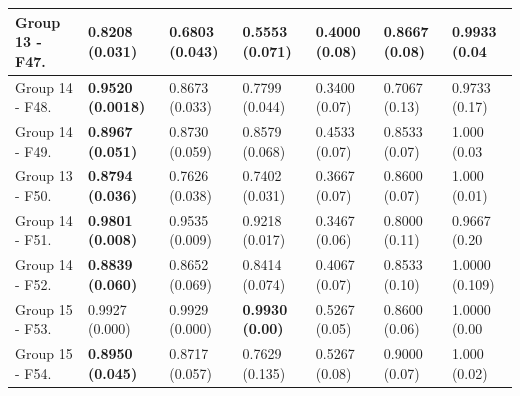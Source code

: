 \begin{center}
\begin{table}[!t]
\begin{tabular}{ccccccc}
		\multicolumn{1}{|l|}{Group 13 - F47.}  & \multicolumn{1}{l}{\textbf{0.8208 (0.031)}} & \multicolumn{1}{l}{0.6803 (0.043)} & \multicolumn{1}{l|}{0.5553 (0.071)}  		& \multicolumn{1}{l}{0.4000 (0.08)} & \multicolumn{1}{l}{0.8667 (0.08)} & \multicolumn{1}{l|}{0.9933 (0.04} \\ \hline
		\multicolumn{1}{|l|}{Group 14 - F48.} & \multicolumn{1}{l}{\textbf{0.9520 (0.0018)}} & \multicolumn{1}{l}{0.8673 (0.033)} & \multicolumn{1}{l|}{0.7799 (0.044)} & \multicolumn{1}{l}{0.3400 (0.07)} & \multicolumn{1}{l}{0.7067 (0.13)} & \multicolumn{1}{l|}{0.9733 (0.17)}  \\ \hline
		\multicolumn{1}{|l|}{Group 14 - F49.}  & \multicolumn{1}{l}{\textbf{0.8967 (0.051)}} & \multicolumn{1}{l}{0.8730 (0.059)} & \multicolumn{1}{l|}{0.8579 (0.068)}  		& \multicolumn{1}{l}{0.4533 (0.07)} & \multicolumn{1}{l}{0.8533 (0.07)} & \multicolumn{1}{l|}{1.000 (0.03} \\ \hline
		\multicolumn{1}{|l|}{Group 13 - F50.}              & \multicolumn{1}{l}{\textbf{0.8794 (0.036)}} & \multicolumn{1}{l}{0.7626 (0.038)} & \multicolumn{1}{l|}{0.7402 (0.031)}  		& \multicolumn{1}{l}{0.3667 (0.07)} & \multicolumn{1}{l}{0.8600 (0.07)} & \multicolumn{1}{l|}{1.000 (0.01)}  \\ \hline%
		\multicolumn{1}{|l|}{Group 14 - F51.}  & \multicolumn{1}{l}{\textbf{0.9801 (0.008)}} & \multicolumn{1}{l}{0.9535 (0.009)} & \multicolumn{1}{l|}{0.9218 (0.017)}  		& \multicolumn{1}{l}{0.3467 (0.06)} & \multicolumn{1}{l}{0.8000 (0.11)} & \multicolumn{1}{l|}{0.9667 (0.20} \\ \hline
		\multicolumn{1}{|l|}{Group 14 - F52.}              & \multicolumn{1}{l}{\textbf{0.8839 (0.060)}} & \multicolumn{1}{l}{0.8652 (0.069)} & \multicolumn{1}{l|}{0.8414 (0.074)}  		& \multicolumn{1}{l}{0.4067 (0.07)} & \multicolumn{1}{l}{0.8533 (0.10)} & \multicolumn{1}{l|}{1.0000 (0.109)}  \\ \hline %
		\multicolumn{1}{|l|}{Group 15 - F53.}  & \multicolumn{1}{l}{0.9927 (0.000)} & \multicolumn{1}{l}{0.9929 (0.000)} & \multicolumn{1}{l|}{\textbf{0.9930 (0.00)}}  		& \multicolumn{1}{l}{0.5267 (0.05)} & \multicolumn{1}{l}{0.8600 (0.06)} & \multicolumn{1}{l|}{1.0000 (0.00} \\ \hline
		\multicolumn{1}{|l|}{Group 15 - F54.}              & \multicolumn{1}{l}{\textbf{0.8950 (0.045)}} & \multicolumn{1}{l}{0.8717 (0.057)} & \multicolumn{1}{l|}{0.7629 (0.135)}  		& \multicolumn{1}{l}{0.5267 (0.08)} & \multicolumn{1}{l}{0.9000 (0.07)} & \multicolumn{1}{l|}{1.000 (0.02)}  \\ \hline

\end{tabular}
\end{table}
\end{center}

